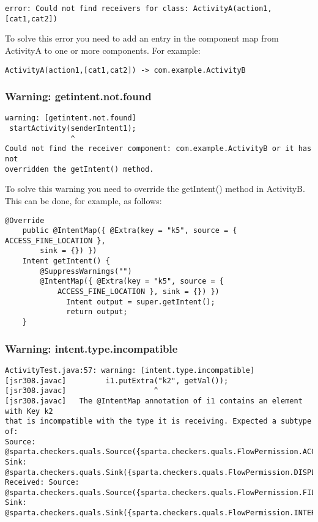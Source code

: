 \begin{Verbatim}
error: Could not find receivers for class: ActivityA(action1,[cat1,cat2])
\end{Verbatim}

To solve this error you need to add an entry in the component map from 
ActivityA to one or more components. For example:

\begin{Verbatim}
ActivityA(action1,[cat1,cat2]) -> com.example.ActivityB
\end{Verbatim}

\subsubsection{Warning: getintent.not.found}

\begin{Verbatim}
warning: [getintent.not.found] 
 startActivity(senderIntent1);
               ^
Could not find the receiver component: com.example.ActivityB or it has not
overridden the getIntent() method.
\end{Verbatim}

To solve this warning you need to override the getIntent() method in ActivityB.
This can be done, for example, as follows:

\begin{Verbatim}
@Override
    public @IntentMap({ @Extra(key = "k5", source = { ACCESS_FINE_LOCATION },
		sink = {}) }) 
	Intent getIntent() {
		@SuppressWarnings("")
		@IntentMap({ @Extra(key = "k5", source = {
			ACCESS_FINE_LOCATION }, sink = {}) }) 
		      Intent output = super.getIntent();
		      return output;
	}
\end{Verbatim}

\subsubsection{Warning: intent.type.incompatible}

\begin{Verbatim}
ActivityTest.java:57: warning: [intent.type.incompatible] 
[jsr308.javac]         i1.putExtra("k2", getVal());
[jsr308.javac]                    ^
[jsr308.javac]   The @IntentMap annotation of i1 contains an element with Key k2
that is incompatible with the type it is receiving. Expected a subtype of:
Source:
@sparta.checkers.quals.Source({sparta.checkers.quals.FlowPermission.ACCESS_FINE_LOCATION}).
Sink:
@sparta.checkers.quals.Sink({sparta.checkers.quals.FlowPermission.DISPLAY}).
Received: Source:
@sparta.checkers.quals.Source({sparta.checkers.quals.FlowPermission.FILESYSTEM}).
Sink:
@sparta.checkers.quals.Sink({sparta.checkers.quals.FlowPermission.INTERNET}).
\end{Verbatim}

